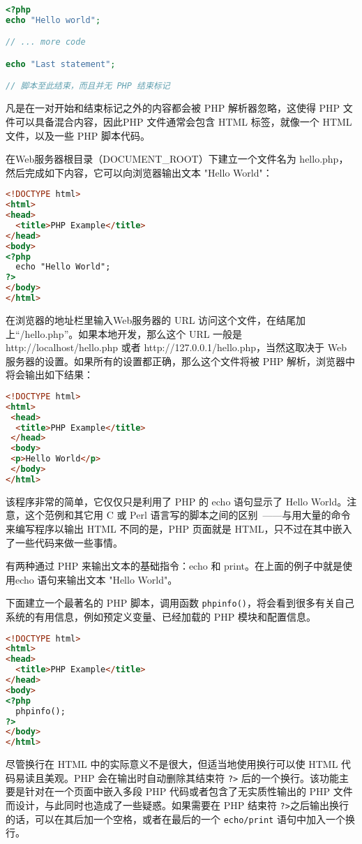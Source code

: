 \begin{lstlisting}[language=PHP]
<?php
echo "Hello world";

// ... more code

echo "Last statement";

// 脚本至此结束，而且并无 PHP 结束标记
\end{lstlisting}

凡是在一对开始和结束标记之外的内容都会被 PHP 解析器忽略，这使得 PHP 文件可以具备混合内容，因此PHP 文件通常会包含 HTML 标签，就像一个 HTML 文件，以及一些 PHP 脚本代码。

在Web服务器根目录（DOCUMENT\_ROOT）下建立一个文件名为 hello.php，然后完成如下内容，它可以向浏览器输出文本 "Hello World"：

\begin{lstlisting}[language=HTML]
<!DOCTYPE html>
<html>
<head>
  <title>PHP Example</title>
</head>
<body>
<?php
  echo "Hello World";
?>
</body>
</html>
\end{lstlisting}

在浏览器的地址栏里输入Web服务器的 URL 访问这个文件，在结尾加上“/hello.php”。如果本地开发，那么这个 URL 一般是 http://localhost/hello.php 或者 http://127.0.0.1/hello.php，当然这取决于 Web 服务器的设置。如果所有的设置都正确，那么这个文件将被 PHP 解析，浏览器中将会输出如下结果：

\begin{lstlisting}[language=HTML]
<!DOCTYPE html>
<html>
 <head>
  <title>PHP Example</title>
 </head>
 <body>
 <p>Hello World</p>
 </body>
</html>
\end{lstlisting}

该程序非常的简单，它仅仅只是利用了 PHP 的 echo 语句显示了 Hello World。注意，这个范例和其它用 C 或 Perl 语言写的脚本之间的区别~——与用大量的命令来编写程序以输出 HTML 不同的是，PHP 页面就是 HTML，只不过在其中嵌入了一些代码来做一些事情。


有两种通过 PHP 来输出文本的基础指令：echo 和 print。在上面的例子中就是使用echo 语句来输出文本 "Hello World"。

下面建立一个最著名的 PHP 脚本，调用函数 \texttt{phpinfo()}，将会看到很多有关自己系统的有用信息，例如预定义变量、已经加载的 PHP 模块和配置信息。

\begin{lstlisting}[language=HTML]
<!DOCTYPE html>
<html>
<head>
  <title>PHP Example</title>
</head>
<body>
<?php
  phpinfo();
?>
</body>
</html>
\end{lstlisting}

尽管换行在 HTML 中的实际意义不是很大，但适当地使用换行可以使 HTML 代码易读且美观。PHP 会在输出时自动删除其结束符 \texttt{?>} 后的一个换行。该功能主要是针对在一个页面中嵌入多段 PHP 代码或者包含了无实质性输出的 PHP 文件而设计，与此同时也造成了一些疑惑。如果需要在 PHP 结束符 \texttt{?>}之后输出换行的话，可以在其后加一个空格，或者在最后的一个 \texttt{echo/print} 语句中加入一个换行。


